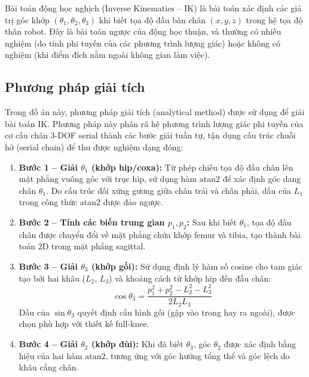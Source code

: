 Bài toán động học nghịch (Inverse Kinematics -- IK) là bài toán xác định các giá trị góc khớp $(\theta_1, \theta_2, \theta_3)$ khi biết tọa độ đầu bàn chân $(x, y, z)$ trong hệ tọa độ thân robot. Đây là bài toán ngược của động học thuận, và thường có nhiều nghiệm (do tính phi tuyến của các phương trình lượng giác) hoặc không có nghiệm (khi điểm đích nằm ngoài không gian làm việc).

\subsection{Phương pháp giải tích}

Trong đồ án này, phương pháp giải tích (analytical method) được sử dụng để giải bài toán IK. Phương pháp này phân rã hệ phương trình lượng giác phi tuyến của cơ cấu chân 3-DOF serial thành các bước giải tuần tự, tận dụng cấu trúc chuỗi hở (serial chain) để thu được nghiệm dạng đóng:

\begin{enumerate}
    \item \textbf{Bước 1 -- Giải $\theta_1$ (khớp hip/coxa):} Từ phép chiếu tọa độ đầu chân lên mặt phẳng vuông góc với trục hip, sử dụng hàm $\text{atan2}$ để xác định góc dang chân $\theta_1$. Do cấu trúc đối xứng gương giữa chân trái và chân phải, dấu của $L_1$ trong công thức $\text{atan2}$ được đảo ngược.

    \item \textbf{Bước 2 -- Tính các biến trung gian $p_1, p_2$:} Sau khi biết $\theta_1$, tọa độ đầu chân được chuyển đổi về mặt phẳng chứa khớp femur và tibia, tạo thành bài toán 2D trong mặt phẳng sagittal.

    \item \textbf{Bước 3 -- Giải $\theta_3$ (khớp gối):} Sử dụng định lý hàm số cosine cho tam giác tạo bởi hai khâu ($L_2$, $L_3$) và khoảng cách từ khớp hip đến đầu chân:
    \begin{equation}
        \cos\theta_3 = \frac{p_1^2 + p_2^2 - L_2^2 - L_3^2}{2 L_2 L_3}
    \end{equation}
    Dấu của $\sin\theta_3$ quyết định cấu hình gối (gập vào trong hay ra ngoài), được chọn phù hợp với thiết kế full-knee.

    \item \textbf{Bước 4 -- Giải $\theta_2$ (khớp đùi):} Khi đã biết $\theta_3$, góc $\theta_2$ được xác định bằng hiệu của hai hàm $\text{atan2}$, tương ứng với góc hướng tổng thể và góc lệch do khâu cẳng chân.
\end{enumerate}

